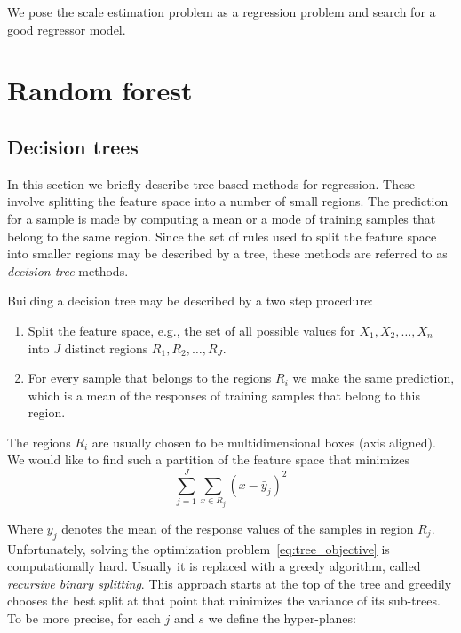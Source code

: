 \documentclass[twoside]{article}
\newcommand*\mean[1]{\bar{#1}}
\begin{document}
We pose the scale estimation problem as a regression problem and
search for a good regressor model.

\section{Random forest}

\subsection{Decision trees}

In this section we briefly describe tree-based methods for regression.
These involve splitting the feature space into a number of small
regions.  The prediction for a sample is made by computing a mean or a
mode of training samples that belong to the same region.  Since the
set of rules used to split the feature space into smaller regions may
be described by a tree, these methods are referred to as
\textit{decision tree} methods.

Building a decision tree may be described by a two step procedure:
\begin{enumerate}
\item Split the feature space, e.g., the set of all possible values
  for $X_1, X_2,\ldots,X_n$ into $J$ distinct regions $R_1, R_2,\ldots, R_J$.
\item For every sample that belongs to the regions $R_i$ we make the
  same prediction, which is a mean of the responses of training
  samples that belong to this region.
\end{enumerate}

The regions $R_i$ are usually chosen to be multidimensional boxes (axis aligned).  We would like to find such a partition of the feature space that minimizes
\begin{equation}\label{eq:tree_objective}
\sum\limits_{j=1}^J\sum_{x\in R_j}{(x-\mean{y}_j)^2}
\end{equation}

Where $y_j$ denotes the mean of the response values of the samples in
region $R_j$.  Unfortunately, solving the optimization
problem~\ref{eq:tree_objective} is computationally hard.  Usually it
is replaced with a greedy algorithm, called \textit{recursive binary
  splitting}.  This approach starts at the top of the tree and
greedily chooses the best split at that point that minimizes the
variance of its sub-trees.  To be more precise, for each $j$ and $s$
we define the hyper-planes:
\end{document}
